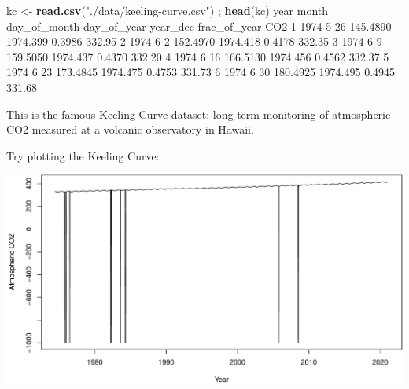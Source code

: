 \documentclass[
]{book}
\newenvironment{Shaded}{\begin{snugshade}}{\end{snugshade}}
\newcommand{\DataTypeTok}[1]{\textcolor[rgb]{0.13,0.29,0.53}{#1}}
\newcommand{\DecValTok}[1]{\textcolor[rgb]{0.00,0.00,0.81}{#1}}
\newcommand{\FloatTok}[1]{\textcolor[rgb]{0.00,0.00,0.81}{#1}}
\newcommand{\KeywordTok}[1]{\textcolor[rgb]{0.13,0.29,0.53}{\textbf{#1}}}
\newcommand{\NormalTok}[1]{#1}
\newcommand{\OperatorTok}[1]{\textcolor[rgb]{0.81,0.36,0.00}{\textbf{#1}}}
\newcommand{\StringTok}[1]{\textcolor[rgb]{0.31,0.60,0.02}{#1}}
\begin{document}
\begin{Shaded}
\begin{Highlighting}[]
\NormalTok{kc <-}\StringTok{ }\KeywordTok{read.csv}\NormalTok{(}\StringTok{"./data/keeling-curve.csv"}\NormalTok{) ; }\KeywordTok{head}\NormalTok{(kc)}
\NormalTok{  year month day_of_month day_of_year year_dec frac_of_year    CO2}
\DecValTok{1} \DecValTok{1974}     \DecValTok{5}           \DecValTok{26}    \FloatTok{145.4890} \FloatTok{1974.399}       \FloatTok{0.3986} \FloatTok{332.95}
\DecValTok{2} \DecValTok{1974}     \DecValTok{6}            \DecValTok{2}    \FloatTok{152.4970} \FloatTok{1974.418}       \FloatTok{0.4178} \FloatTok{332.35}
\DecValTok{3} \DecValTok{1974}     \DecValTok{6}            \DecValTok{9}    \FloatTok{159.5050} \FloatTok{1974.437}       \FloatTok{0.4370} \FloatTok{332.20}
\DecValTok{4} \DecValTok{1974}     \DecValTok{6}           \DecValTok{16}    \FloatTok{166.5130} \FloatTok{1974.456}       \FloatTok{0.4562} \FloatTok{332.37}
\DecValTok{5} \DecValTok{1974}     \DecValTok{6}           \DecValTok{23}    \FloatTok{173.4845} \FloatTok{1974.475}       \FloatTok{0.4753} \FloatTok{331.73}
\DecValTok{6} \DecValTok{1974}     \DecValTok{6}           \DecValTok{30}    \FloatTok{180.4925} \FloatTok{1974.495}       \FloatTok{0.4945} \FloatTok{331.68}
\end{Highlighting}
\end{Shaded}

This is the famous Keeling Curve dataset: long-term monitoring of atmospheric CO2 measured at a volcanic observatory in Hawaii.

Try plotting the Keeling Curve:

\begin{Shaded}
\end{Shaded}

\includegraphics{figures/unnamed-chunk-309-1.pdf}
\end{document}
